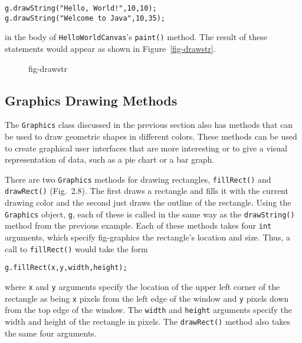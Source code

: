 \begin{jjjlisting}
\begin{lstlisting}
g.drawString("Hello, World!",10,10);
g.drawString("Welcome to Java",10,35);
\end{lstlisting}
\end{jjjlisting}

\noindent in the body of {\tt HelloWorldCanvas}'s {\tt paint()} method.  
The result of these statements would appear as shown in
Figure~\ref{fig-drawstr}.

\begin{figure}[h]
\figascaled{chptr02/drawstr.eps}{0.75}{``Hello, World!'' is drawn
at coordinate (10, 10) and ``Welcome to Java'' at
(10, 35) on the JFrame.}
{fig-drawstr}
\end{figure}

\subsection{Graphics Drawing Methods}

The {\tt Graphics} class discussed in the previous section also has
methods that can be used to draw geometric shapes in different
colors. These methods can be used to create graphical user interfaces
that are more interesting or to give a visual representation of data,
such as a pie chart or a bar graph.

There are two {\tt Graphics} methods for drawing rectangles, 
{\tt fillRect()} and {\tt drawRect()} (Fig.~2.8). The
first draws a rectangle and fills it with the current drawing color
and the second just draws the outline of the rectangle.  Using the
{\tt Graphics} object, {\tt g}, each of these is called in the same
way as the {\tt drawString()} method from the previous example.  
Each of these methods takes four {\tt int} arguments, which specify 
{fig-graphics}
the rectangle's location and size. Thus, a call to {\tt fillRect()}
would take the form

\begin{jjjlisting}
\begin{lstlisting}
g.fillRect(x,y,width,height);
\end{lstlisting}
\end{jjjlisting}

\noindent where {\tt x} and {\tt y} arguments specify the location of 
the upper left corner of the rectangle as being {\tt x} pixels from
the left edge of the window and {\tt y} pixels down from the top edge
of the window. The {\tt width} and {\tt height} arguments specify the
width and height of the rectangle in pixels.  The {\tt drawRect()}
method also takes the same four arguments. 


